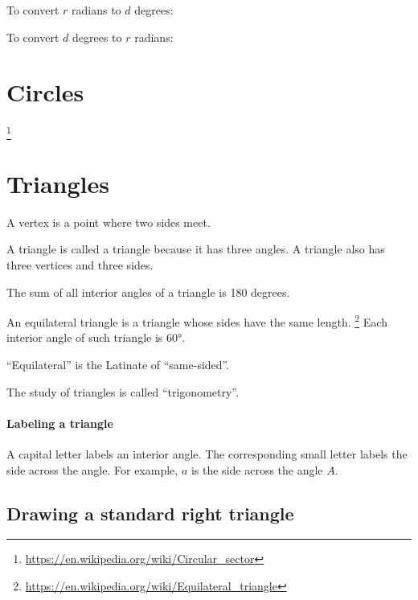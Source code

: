 To convert \(r\) radians to \(d\) degrees:

To convert \(d\) degrees to \(r\) radians:


\ShowAnswers

\section{Circles}

\footnote{\url{https://en.wikipedia.org/wiki/Circular_sector}}

\section{Triangles}

A vertex is a point where two sides meet.

A triangle is called a triangle because it has three angles.
A triangle also has three vertices and three sides.

The sum of all interior angles of a triangle is 180 degrees.

An equilateral triangle is a triangle whose sides have the same length.%
\footnote{\url{https://en.wikipedia.org/wiki/Equilateral_triangle}}
Each interior angle of such triangle is \ang{60}.

\enquote{Equilateral} is the Latinate of \enquote{same-sided}.

The study of triangles is called \enquote{trigonometry}.

\paragraph{Labeling a triangle}

A capital letter labels an interior angle.
The corresponding small letter labels the side across the angle.
For example, \(a\) is the side across the angle \(A\).

\subsection*{Drawing a standard right triangle}

